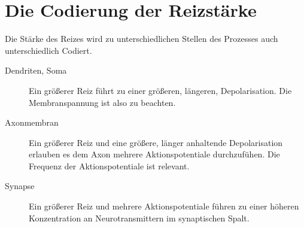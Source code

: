\documentclass{article}
\begin{document}
\section{Die Codierung der Reizstärke}
Die Stärke des Reizes wird zu unterschiedlichen Stellen des Prozesses auch unterschiedlich Codiert. 
\begin{description}
 \item[Dendriten, Soma] Ein größerer Reiz führt zu einer größeren, längeren, Depolarisation. Die Membranspannung ist also zu beachten.
 \item[Axonmembran] Ein größerer Reiz und eine größere, länger anhaltende Depolarisation erlauben es dem Axon mehrere Aktionspotentiale durchzufühen. Die Frequenz der Aktionspotentiale ist relevant.
 \item[Synapse] Ein größerer Reiz und mehrere Aktionspotentiale führen zu einer höheren Konzentration an Neurotransmittern im synaptischen Spalt.
\end{description} 
\end{document}
